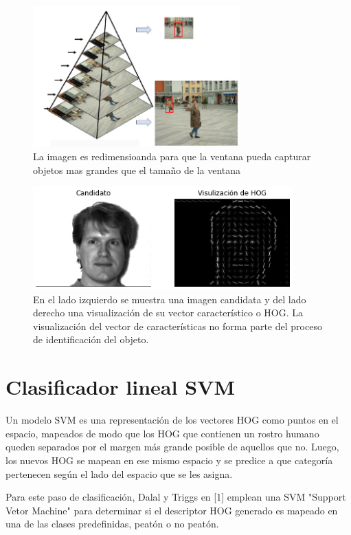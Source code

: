 \documentclass{article}
\begin{document}
\begin{figure}
\centering
\includegraphics[width=8cm]{piramide-00.png}
\caption{La imagen es redimensioanda para que la ventana pueda capturar objetos mas grandes que el tamaño de la ventana}
\label{fig:piramide}
\end{figure}

\begin{figure}[ht]
\centering
\includegraphics[width=10cm]{viz-hog.png}
\caption{En el lado izquierdo se muestra una imagen candidata y del lado derecho una visualización de su vector característico o HOG. La visualización del vector de características no forma parte del proceso de identificación del objeto. }
\label{fig:hog-viz}
\end{figure}

\section*{Clasificador lineal SVM}
Un modelo SVM es una representación de los vectores HOG como puntos en el espacio, mapeados de modo que los HOG que contienen un rostro humano queden separados por el margen más grande posible de aquellos que no. Luego, los nuevos HOG se mapean en ese mismo espacio y se predice a que categoría pertenecen según el lado del espacio que se les asigna. 

Para este paso de clasificación, Dalal y Triggs en [1] emplean una SVM "Support Vetor Machine"  para determinar si el descriptor HOG generado es mapeado en una de las clases predefinidas, peatón o no peatón. 
\end{document}
